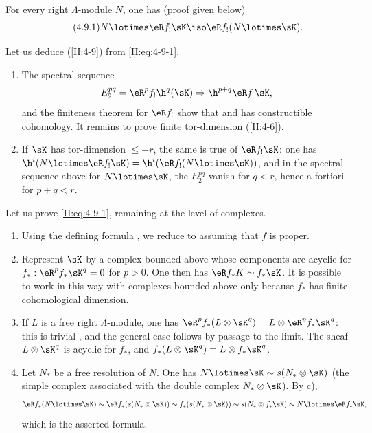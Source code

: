 For every right $\Lambda$-module $N$, one has (proof given below)
\begin{equation*}\tag{4.9.1}\label{II:eq:4-9-1}
  N\lotimes \eR f_! \sK \iso \eR f_! (N\lotimes \sK) \text{.}
\end{equation*}

Let us deduce (\ref{II:4-9}) from \eqref{II:eq:4-9-1}.
\begin{enumerate}[\indent a)]
  \item The spectral sequence
    \[
      E_2^{p q} = \eR^p f_! \h^q(\sK) \Rightarrow \h^{p+q} \eR f_! \sK \text{,}
    \]
    and the finiteness theorem for $\eR f_!$ show that
     and has constructible cohomology.
    It remains to prove finite tor-dimension (\ref{II:4-6}).
  \item If $\sK$ has tor-dimension $\leqslant -r$, the same is true of
    $\eR f_! \sK$: one has
    $\h^i(N\lotimes \eR f_! \sK) = \h^i(\eR f_!(N\lotimes \sK))$, and in the
    spectral sequence above for $N\lotimes \sK$, the $E_2^{p q}$ vanish for
    $q<r$, hence a fortiori for $p+q<r$.
\end{enumerate}

Let us prove \eqref{II:eq:4-9-1}, remaining at the level of complexes.
\begin{enumerate}[\indent a)]
  \item Using the defining formula , we reduce to
    assuming that $f$ is proper.
  \item {}Represent $\sK$ by a complex bounded above whose components are
    acyclic for $f_*:\eR^p f_* \sK^q = 0$ for $p>0$. One then has
    $\eR f_* K \sim f_* \sK$. It is possible to work in this way with
    complexes bounded above only because $f_*$ has finite cohomological
    dimension.
  \item If $L$ is a free right $\Lambda$-module, one has
    $\eR^p f_*(L\otimes \sK^q) = L\otimes \eR^p f_* \sK^q$: this is trivial
    , and the general case follows by
    passage to the limit. The sheaf $L\otimes \sK^q$ is acyclic for $f_*$,
    and $f_*(L\otimes \sK^q) = L\otimes f_* \sK^q$.
  \item Let $N_*$ be a free resolution of $N$. One has
    $N\lotimes \sK\sim s(N_*\otimes \sK)$ (the simple complex
    associated with the double complex $N_*\otimes \sK$). By c),
    \[
      \eR f_*(N\lotimes \sK) \sim \eR f_* (s(N_*\otimes \sK)) \sim f_*(s(N_*\otimes \sK)) \sim s(N_*\otimes f_* \sK) \sim N\lotimes \eR f_* \sK \text{,}
    \]
    which is the asserted formula.
\end{enumerate}

